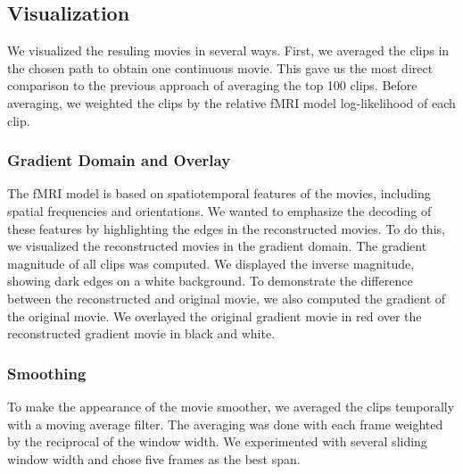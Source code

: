\subsection{Visualization}
We visualized the resuling movies in several ways. First, we averaged the clips in the chosen path to obtain one continuous movie. This gave us the most direct comparison to the previous approach of averaging the top 100 clips. Before averaging, we weighted the clips by the relative fMRI model log-likelihood of each clip. 

\subsubsection{Gradient Domain and Overlay}
The fMRI model is based on spatiotemporal features of the movies, including spatial frequencies and orientations. We wanted to emphasize the decoding of these features by highlighting the edges in the reconstructed movies. To do this, we visualized the reconstructed movies in the gradient domain. The gradient magnitude of all clips was computed. We displayed the inverse magnitude, showing dark edges on a white background. To demonstrate the difference between the reconstructed and original movie, we also computed the gradient of the original movie. We overlayed the original gradient movie in red over the reconstructed gradient movie in black and white.

\subsubsection{Smoothing}
To make the appearance of the movie smoother, we averaged the clips temporally with a moving average filter. The averaging was done with each frame weighted by the reciprocal of the window width. We experimented with several sliding window width and chose five frames as the best span.